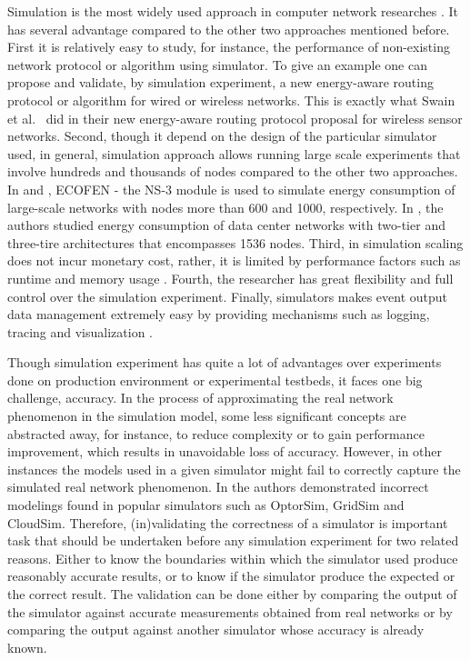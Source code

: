 Simulation is the most widely used approach in computer network researches \cite{DBLP:conf/icc/WeingartnerLW09}. It has several advantage compared to the other two approaches mentioned before. First it is relatively easy to study, for instance, the performance of non-existing network protocol or algorithm using simulator. To give an example one can propose and validate, by simulation experiment, a new energy-aware routing protocol or algorithm for wired or wireless networks. This is exactly what Swain et al.{\ }\cite{DBLP:conf/aina/SwainHC10} did in their new energy-aware routing protocol proposal for wireless sensor networks. Second, though it depend on the design of the particular simulator used, in general, simulation approach allows running large scale experiments that involve hundreds and thousands of nodes compared to the other two approaches. In \cite{DBLP:conf/wowmom/OrgerieLLL11} and \cite{DBLP:conf/cloudnet/CorneaOL14}, ECOFEN - the NS-3 module is used to simulate energy consumption of large-scale networks with nodes more than 600 and 1000, respectively. In \cite{DBLP:journals/tjs/KliazovichBK12}, the authors studied energy consumption of data center networks with two-tier and three-tire architectures that encompasses 1536 nodes. Third, in simulation scaling does not incur monetary cost, rather, it is limited by performance factors such as runtime and memory usage \cite{DBLP:conf/icc/WeingartnerLW09}. Fourth, the researcher has great flexibility and full control over the simulation experiment. Finally, simulators makes event output data management extremely easy by providing mechanisms such as logging, tracing and visualization \cite{ns3,DBLP:journals/jpdc/CasanovaGLQS14}.  

Though simulation experiment has quite a lot of advantages over experiments done on production environment or experimental testbeds, it faces one big challenge, accuracy. In the process of approximating the real network phenomenon in the simulation model, some less significant concepts are abstracted away, for instance, to reduce complexity or to gain performance improvement, which results in unavoidable loss of accuracy. However, in other instances the models used in a given simulator might fail to correctly capture the simulated real network phenomenon. In \cite{DBLP:journals/tomacs/VelhoSCL13} the authors demonstrated incorrect modelings found in popular simulators such as OptorSim, GridSim and CloudSim. Therefore, (in)validating the correctness of a simulator is important task that should be undertaken before any simulation experiment for two related reasons. Either to know the boundaries within which the simulator used produce reasonably accurate results, or to know if the simulator produce the expected or the correct result. The validation can be done either by comparing the output of the simulator against accurate measurements obtained from real networks or by comparing the output against another simulator whose accuracy is already known\cite{DBLP:books/daglib/0076234}.
